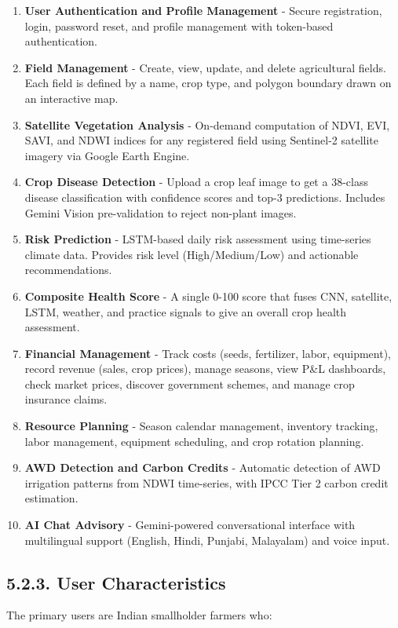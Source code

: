 \documentclass[12pt, a4paper]{report}
\begin{document}
\begin{enumerate}[leftmargin=*]
  \item \textbf{User Authentication and Profile Management} - Secure registration, login, password reset, and profile management with token-based authentication.
  \item \textbf{Field Management} - Create, view, update, and delete agricultural fields. Each field is defined by a name, crop type, and polygon boundary drawn on an interactive map.
  \item \textbf{Satellite Vegetation Analysis} - On-demand computation of NDVI, EVI, SAVI, and NDWI indices for any registered field using Sentinel-2 satellite imagery via Google Earth Engine.
  \item \textbf{Crop Disease Detection} - Upload a crop leaf image to get a 38-class disease classification with confidence scores and top-3 predictions. Includes Gemini Vision pre-validation to reject non-plant images.
  \item \textbf{Risk Prediction} - LSTM-based daily risk assessment using time-series climate data. Provides risk level (High/Medium/Low) and actionable recommendations.
  \item \textbf{Composite Health Score} - A single 0-100 score that fuses CNN, satellite, LSTM, weather, and practice signals to give an overall crop health assessment.
  \item \textbf{Financial Management} - Track costs (seeds, fertilizer, labor, equipment), record revenue (sales, crop prices), manage seasons, view P\&L dashboards, check market prices, discover government schemes, and manage crop insurance claims.
  \item \textbf{Resource Planning} - Season calendar management, inventory tracking, labor management, equipment scheduling, and crop rotation planning.
  \item \textbf{AWD Detection and Carbon Credits} - Automatic detection of AWD irrigation patterns from NDWI time-series, with IPCC Tier 2 carbon credit estimation.
  \item \textbf{AI Chat Advisory} - Gemini-powered conversational interface with multilingual support (English, Hindi, Punjabi, Malayalam) and voice input.
\end{enumerate}
\subsection{5.2.3. User Characteristics}
The primary users are Indian smallholder farmers who:
\end{document}
